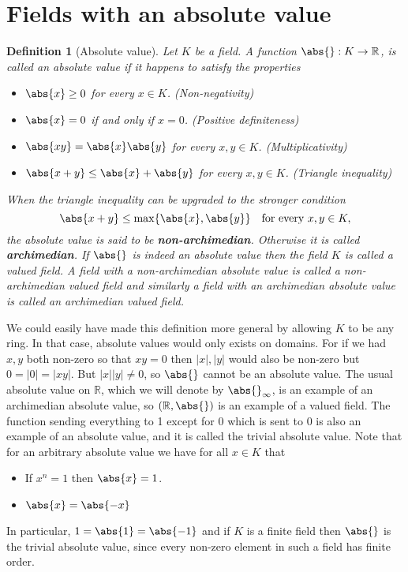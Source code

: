 \documentclass{article}
\newtheorem{definition}{Definition}[section]
\newcommand{\mbb}[1]{\mathbb{#1}}
\begin{document}
\section{Fields with an absolute value}

\begin{definition}[Absolute value]
    Let $K$ be a field. A function $\abs{} : K \to \mbb R$, is called an absolute value if it happens to satisfy the properties
    \begin{itemize}
        \item $\abs{x} \geq 0$ for every $x \in K$. (Non-negativity)
        \item $\abs{x} = 0$ if and only if $x = 0$. (Positive definiteness)
        \item $\abs{xy} = \abs{x} \abs{y}$ for every $x,y \in K$. (Multiplicativity)
        \item $\abs{x + y} \leq \abs{x} + \abs{y}$ for every $x,y \in K$. (Triangle inequality)
    \end{itemize}
    When the triangle inequality can be upgraded to the stronger condition $$\abs{x + y} \leq \max \{\abs{x}, \abs{y}\} \quad \text{for every } x,y \in K,$$
    the absolute value is said to be \textbf{non-archimedian}. Otherwise it is called \textbf{archimedian}. If $\abs{}$ is indeed an absolute value then the field $K$ is called a valued field. A field with a non-archimedian absolute value is called a non-archimedian valued field and similarly a field with an archimedian absolute value is called an archimedian valued field.
\end{definition}
We could easily have made this definition more general by allowing $K$ to be any ring. In that case, absolute values would only exists on domains. For if we had $x,y$ both non-zero so that $xy = 0$ then $|x|, |y|$ would also be non-zero but $0 = |0| = |xy|$. But $|x||y| \neq 0$, so $\abs{}$ cannot be an absolute value. The usual absolute value on $\mbb R$, which we will denote by $\abs{}_\infty$,  is an example of an archimedian absolute value, so $(\mbb R, \abs{})$ is an example of a valued field. The function sending everything to 1 except for 0 which is sent to 0 is also an example of an absolute value, and it is called the trivial absolute value. Note that for an arbitrary absolute value we have for all $x \in K$ that
\begin{itemize}
    \item If $x^n = 1$ then $\abs{x} = 1$.
    \item $\abs{x} = \abs{-x}$
\end{itemize}
In particular, $1 = \abs{1} = \abs{-1}$ and if $K$ is a finite field then $\abs{}$ is the trivial absolute value, since every non-zero element in such a field has finite order.
\end{document}
